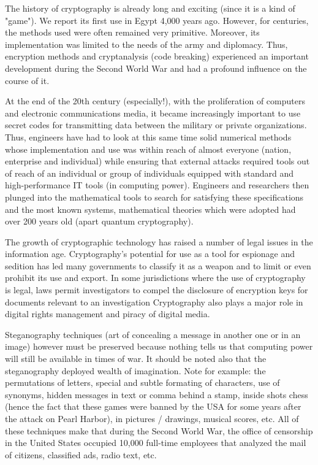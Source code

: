 	The history of cryptography is already long and exciting (since it is a kind of "game"). We report its first use in Egypt 4,000 years ago. However, for centuries, the methods used were often remained very primitive. Moreover, its implementation was limited to the needs of the army and diplomacy. Thus, encryption methods and cryptanalysis (code breaking) experienced an important development during the Second World War and had a profound influence on the course of it.
	
	At the end of the 20th century (especially!), with the proliferation of computers and electronic communications media, it became increasingly important to use secret codes for transmitting data between the military or private organizations. Thus, engineers have had to look at this same time solid numerical methods whose implementation and use was within reach of almost everyone (nation, enterprise and individual) while ensuring that external attacks required tools out of reach of an individual or group of individuals equipped with standard and high-performance IT tools (in computing power). Engineers and researchers then plunged into the mathematical tools to search for satisfying these specifications and the most known systems, mathematical theories which were adopted had over 200 years old (apart quantum cryptography).
	
	The growth of cryptographic technology has raised a number of legal issues in the information age. Cryptography's potential for use as a tool for espionage and sedition has led many governments to classify it as a weapon and to limit or even prohibit its use and export. In some jurisdictions where the use of cryptography is legal, laws permit investigators to compel the disclosure of encryption keys for documents relevant to an investigation Cryptography also plays a major role in digital rights management and piracy of digital media.
	
	Steganography techniques (art of concealing a message in another one or in an image) however must be preserved because nothing tells us that computing power will still be available in times of war. It should be noted also that the steganography deployed wealth of imagination. Note for example: the permutations of letters, special and subtle formating of characters, use of synonyms, hidden messages in text or comma behind a stamp, inside shots chess (hence the fact that these games were banned by the USA for some years after the attack on Pearl Harbor), in pictures / drawings, musical scores, etc. All of these techniques make that during the Second World War, the office of censorship in the United States occupied 10,000 full-time employees that analyzed the mail of citizens, classified ads, radio text, etc.
	
